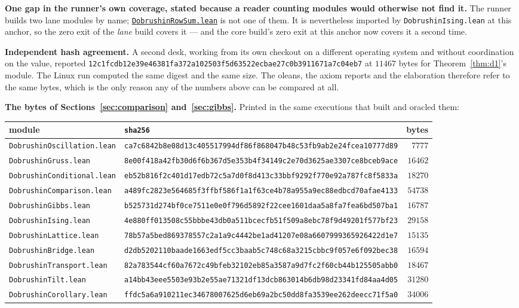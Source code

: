 \documentclass[11pt]{article}
\theoremstyle{definition}
\newcommand{\anchor}{c7b870b05bd6d1bec270d499e1358a64070ce0e1}
\newcommand{\repofile}[2]{%
  \href{https://github.com/lluiseriksson/THE-ERIKSSON-PROGRAMME/blob/\anchor/#1}{\nolinkurl{#2}}}
\begin{document}
\textbf{One gap in the runner's own coverage, stated because a reader counting
modules would otherwise not find it.}  The runner builds two lane modules by
name; \repofile{YangMills/OS/DobrushinRowSum.lean}{DobrushinRowSum.lean} is not
one of them.  It is nevertheless imported by
\texttt{DobrushinIsing.lean} at this anchor, so the zero exit of the
\emph{lane} build covers it --- and the core build's zero exit at this
anchor now covers it a second time.

\textbf{Independent hash agreement.}  A second desk, working from its own
checkout on a different operating system and without coordination on the value,
reported
\nolinkurl{12c1fcdb12e39e46381fa372a102503f5d63522ecbae27c0b3911671a7c04eb7} at
$11467$ bytes for Theorem~\ref{thm:d1}'s module.  The Linux run computed the
same digest and the same size.  The oleans, the axiom reports and the
elaboration therefore refer to the same bytes, which is the only reason any of
the numbers above can be compared at all.

\textbf{The bytes of Sections~\ref{sec:comparison} and~\ref{sec:gibbs}.}
Printed in the same executions that built and oracled them:
\begin{center}\small
\begin{tabular}{llr}
\toprule
module & \texttt{sha256} & bytes\\
\midrule
\texttt{DobrushinOscillation.lean} & \nolinkurl{ca7c6842b8e08d13c405517994df86f868047b48c53fb9ab2e24fcea10777d89} & $7777$\\
\texttt{DobrushinGruss.lean} & \nolinkurl{8e00f418a42fb30d6f6b367d5e353b4f34149c2e70d3625ae3307ce8bceb9ace} & $16462$\\
\texttt{DobrushinConditional.lean} & \nolinkurl{eb52b816f2c401d17edb72c5a7d0f8d413c33bbf9292f770e92a787fc8f5833a} & $18270$\\
\texttt{DobrushinComparison.lean} & \nolinkurl{a489fc2823e564685f3ffbf586f1a1f63ce4b78a955a9ec88edbcd70afae4133} & $54738$\\
\texttt{DobrushinGibbs.lean} & \nolinkurl{b525731d274bf0ce7511e0e0f796d5892f22cee1601daa5a8fa7fea6bd507ba1} & $16787$\\
\texttt{DobrushinIsing.lean} & \nolinkurl{4e880ff013508c55bbbe43db0a511bcecfb51f509a8ebc78f9d49201f577bf23} & $29158$\\
\texttt{DobrushinLattice.lean} & \nolinkurl{78b57a5bed869378557c2a1a9c4442be1ad41207e08a6607999365926422d1e7} & $15135$\\
\texttt{DobrushinBridge.lean} & \nolinkurl{d2db5202110baade1663edf5cc3baab5c748c68a3215cbbc9f057e6f092bec38} & $16594$\\
\texttt{DobrushinTransport.lean} & \nolinkurl{82a783544cf60a7672c49bfeb32102eb85a3587a9d7fc2f60cb44b125505abb0} & $18467$\\
\texttt{DobrushinTilt.lean} & \nolinkurl{a14bb43eee5503e93b2e55ae71321df13dcb863014b6db98d23341fd84aa4d05} & $31280$\\
\texttt{DobrushinCorollary.lean} & \nolinkurl{ffdc5a6a910211ec34678007625d6eb69a2bc50dd8fa3539ee262deecc71f5a0} & $34006$\\
\bottomrule
\end{tabular}
\end{center}
\end{document}

